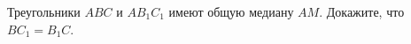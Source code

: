 \begin{ex}
	\begin{condition}
		Треугольники \( ABC  \) и \( AB_1C_1  \) имеют общую медиану \( AM  \). Докажите, что \( BC_1 = B_1C \).
	\end{condition}
\end{ex}